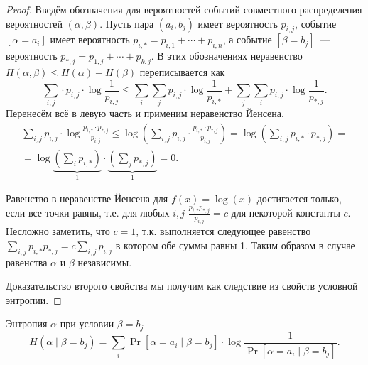 \documentclass[12pt]{article}
\begin{document}
\begin{proof}
Введём обозначения для вероятностей событий совместного распределения вероятностей \((\alpha, \beta)\). Пусть пара \((a_i, b_j)\) имеет вероятность \(p_{i,j}\), событие \([\alpha=a_i]\) имеет вероятность \(p_{i,*} = p_{i,1} + \dotsb + p_{i,n}\), а событие 
\([\beta=b_j]\)~--- вероятность \(p_{*,j} = p_{1,j} + \dotsb + p_{k,j}\). В этих обозначениях неравенство \(H(\alpha, \beta) \le H(\alpha) + H(\beta)\) переписывается как
\[
\sum_{i,j}\cdot p_{i,j}\cdot \log\frac1{p_{i,j}} \le
\sum_{i}\sum_{j} p_{i,j}\cdot \log\frac1{p_{i,*}} +
\sum_{j}\sum_{i} p_{i,j}\cdot \log\frac1{p_{*,j}}.
\]
Перенесём всё в левую часть и применим неравенство Йенсена.
\begin{multline*}
\sum_{i,j}p_{i,j}\cdot \log\frac{p_{i,*}\cdot p_{*,j}}{p_{i,j}} \le
\log\left(\sum_{i,j}p_{i,j}\cdot \frac{p_{i,*}\cdot p_{*,j}}{p_{i,j}}\right) =
\log\left(\sum_{i,j}p_{i,*}\cdot p_{*,j}\right) = \\
= \log \underbrace{\left(\sum_{i}p_{i,*}\right)}_1\cdot
     \underbrace{\left(\sum_{j}p_{*,j}\right)}_1 = 0.
\end{multline*}

Равенство в неравенстве Йенсена для $f(x) = \log(x)$ достигается только, если все точки равны, т.е. 
для любых \(i,j\) \(\frac{p_{i,*}p_{*,j}}{p_{i,j}} = c\) для некоторой константы \(c\). Несложно заметить, что \(c =
1\), т.к. выполняется следующее равенство \(\sum_{i,j} {p_{i,*}p_{*,j}} = c \sum_{i,j}{p_{i,j}}\) в котором обе суммы
равны 1. Таким образом в случае равенства \(\alpha\) и \(\beta\) независимы.

Доказательство второго свойства мы получим как следствие из свойств условной энтропии.
\end{proof}

\begin{definition}\label{def:cond-entropy1}
Энтропия \(\alpha\) при условии \(\beta = b_j\)
\[H(\alpha\mid\beta = b_j) = \sum_i \Pr[\alpha = a_i\mid \beta = b_j]\cdot
    \log\frac{1}{\Pr[\alpha = a_i\mid \beta = b_j]}. \]
\end{definition}
\end{document}
